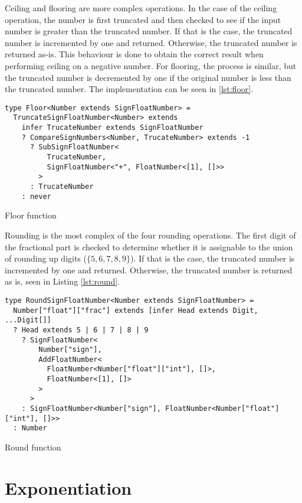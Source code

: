 Ceiling and flooring are more complex operations. In the case of the ceiling operation, the number is first truncated and then checked to see if the input number is greater than the truncated number. If that is the case, the truncated number is incremented by one and returned. Otherwise, the truncated number is returned as-is. This behaviour is done to obtain the correct result when performing ceiling on a negative number. For flooring, the process is similar, but the truncated number is decremented by one if the original number is less than the truncated number. The implementation can be seen in \ref{lst:floor}.

\begin{listing}[ht]
  \begin{verbatim}
type Floor<Number extends SignFloatNumber> =
  TruncateSignFloatNumber<Number> extends 
    infer TrucateNumber extends SignFloatNumber
    ? CompareSignNumbers<Number, TrucateNumber> extends -1
      ? SubSignFloatNumber<
          TrucateNumber,
          SignFloatNumber<"+", FloatNumber<[1], []>>
        >
      : TrucateNumber
    : never
\end{verbatim}
  \caption{Floor function}\label{lst:floor}
\end{listing}

\clearpage

Rounding is the most complex of the four rounding operations. The first digit of the fractional part is checked to determine whether it is assignable to the union of rounding up digits ($\{ 5,6,7,8,9 \}$). If that is the case, the truncated number is incremented by one and returned. Otherwise, the truncated number is returned as is, seen in Listing \ref{lst:round}.

\begin{listing}[ht]
  \begin{verbatim}
type RoundSignFloatNumber<Number extends SignFloatNumber> =
  Number["float"]["frac"] extends [infer Head extends Digit, ...Digit[]]
  ? Head extends 5 | 6 | 7 | 8 | 9
    ? SignFloatNumber<
        Number["sign"],
        AddFloatNumber<
          FloatNumber<Number["float"]["int"], []>,
          FloatNumber<[1], []>
        >
      >
    : SignFloatNumber<Number["sign"], FloatNumber<Number["float"]["int"], []>>
  : Number
\end{verbatim}
  \caption{Round function}\label{lst:round}
\end{listing}

\section{Exponentiation}

